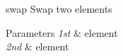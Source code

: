 swap Swap two elements 
\begin{DoxyParams}{Parameters}
{\em 1st} & element \\
\hline
{\em 2nd} & element \\
\hline
\end{DoxyParams}
